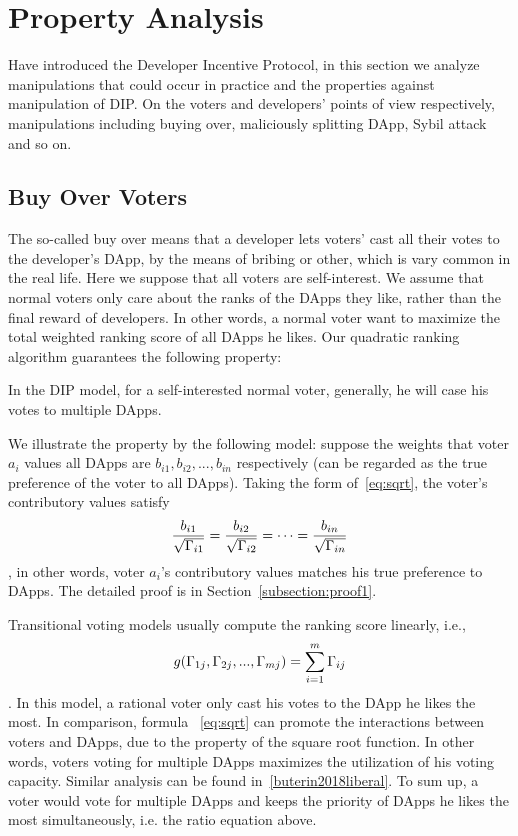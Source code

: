 \section{Property Analysis}
\label{section:properties}
Have introduced the Developer Incentive Protocol, in this section we analyze  manipulations that could occur in practice and the properties against manipulation of  DIP. On the voters and developers' points of view respectively, manipulations including buying over, maliciously splitting DApp, Sybil attack and so on.
\subsection{Buy Over Voters}
The so-called buy over means that a developer lets voters' cast all their votes to the developer's DApp, by the means of bribing or other, which is vary common in the real life. Here we suppose that all voters are self-interest. We assume that normal voters only care about the ranks of the DApps they like, rather than the final reward of developers. In other words, a normal voter want to maximize the total
weighted ranking score of all DApps he likes. Our quadratic ranking algorithm guarantees the following property:
\begin{property}
	\label{p1}
	In the DIP model, for a self-interested normal voter, generally, he will case his votes to multiple DApps.  
\end{property}
We illustrate the property by the following model: suppose the weights that voter $a_i$ values all DApps are $b_{i1}, b_{i2}, ..., b_{in}$ respectively (can be regarded as the true preference of the voter to all DApps). Taking the form of~\ref{eq:sqrt}, the voter's contributory values satisfy 
$$\frac{b_{i1}}{\sqrt{\Gamma_{i1}}}=\frac{b_{i2}}{\sqrt{\Gamma_{i2}}}=\cdots=\frac{b_{in}}{\sqrt{\Gamma_{in}}}$$,
in other words, voter $a_i$'s contributory values matches his true preference to DApps. The detailed proof is in Section~\ref{subsection:proof1}.

Transitional voting models usually compute the ranking score linearly, i.e.,
$$g(\Gamma_{1j},\Gamma_{2j},...,\Gamma_{mj}) = \sum_{i=1}^m \Gamma_{ij}$$.
In this model, a rational voter only cast his votes to the DApp he likes the most. In comparison, formula ~\ref{eq:sqrt} can promote the interactions between voters and DApps, due to the property of the square root function. In other words, voters voting for multiple DApps maximizes the utilization of his voting capacity. Similar analysis can be found in~\ref{buterin2018liberal}. To sum up, a voter would vote for multiple DApps and keeps the priority of DApps he likes the most simultaneously, i.e. the ratio equation above.


